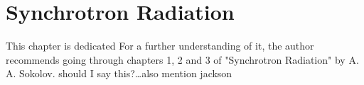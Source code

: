 \chapter{Synchrotron Radiation}

\label{c:sr} %


This chapter is dedicated 
For a further understanding of it, the author
  recommends going through chapters 1, 2 and 3 of "Synchrotron Radiation" by
  A. A. Sokolov. should I say this?\ldots also mention jackson
